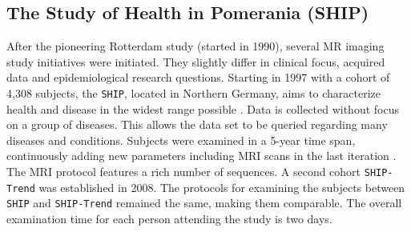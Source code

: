 \documentclass[journal]{style/vgtc} 			          %
\begin{document}

\subsection{The Study of Health in Pomerania (SHIP)}
After the pioneering Rotterdam study (started in 1990), several MR imaging study initiatives were initiated.
%
They slightly differ in clinical focus, acquired data and epidemiological research questions.
%
Starting in 1997 with a cohort of 4,308 subjects, the \texttt{SHIP}, located in Northern Germany, aims to characterize health and disease in the widest range possible \cite{Volzke2011}.
%
Data is collected without focus on a group of diseases.
%
This allows the data set to be queried regarding many diseases and conditions.
%
Subjects were examined in a 5-year time span, continuously adding new parameters including MRI scans in the last iteration \cite{Hegenscheid2009}.
%
The MRI protocol features a rich number of sequences.
%
A second cohort \texttt{SHIP-Trend} was established in 2008.
%
The protocols for examining the subjects between \texttt{SHIP} and \texttt{SHIP-Trend} remained the same, making them comparable.
%
The overall examination time for each person attending the study is two days.

%
\end{document}
